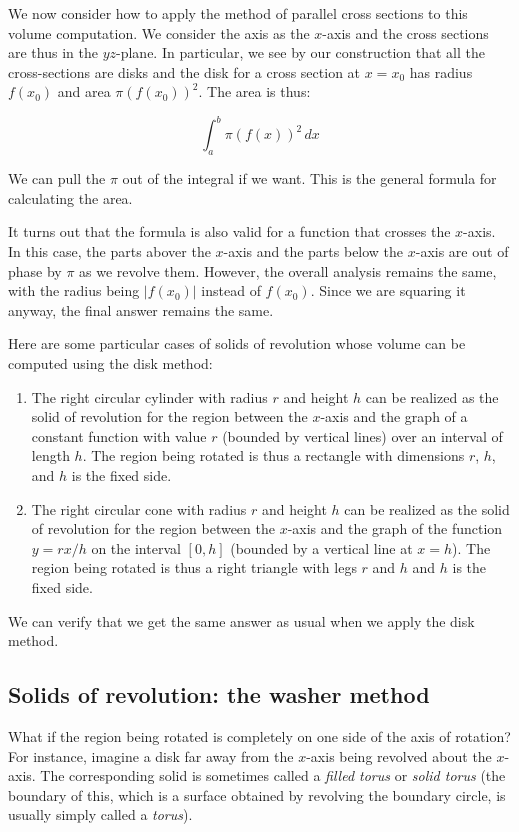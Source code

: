 \documentclass[10pt]{amsart}
\begin{document}
We now consider how to apply the method of parallel cross sections to
this volume computation. We consider the axis as the $x$-axis and the
cross sections are thus in the $yz$-plane. In particular, we see by
our construction that all the cross-sections are disks and the disk
for a cross section at $x = x_0$ has radius $f(x_0)$ and area $\pi
(f(x_0))^2$. The area is thus:

$$\int_a^b \pi (f(x))^2 \, dx$$

We can pull the $\pi$ out of the integral if we want. This is the
general formula for calculating the area.

It turns out that the formula is also valid for a function that
crosses the $x$-axis. In this case, the parts abover the $x$-axis and
the parts below the $x$-axis are out of phase by $\pi$ as we revolve
them. However, the overall analysis remains the same, with the radius
being $|f(x_0)|$ instead of $f(x_0)$. Since we are squaring it anyway,
the final answer remains the same.

Here are some particular cases of solids of revolution whose volume can be computed using the disk method:

\begin{enumerate}
\item The right circular cylinder with radius $r$ and height $h$ can
  be realized as the solid of revolution for the region between the
  $x$-axis and the graph of a constant function with value $r$
  (bounded by vertical lines) over an interval of length $h$. The
  region being rotated is thus a rectangle with dimensions $r$, $h$,
  and $h$ is the fixed side.
\item The right circular cone with radius $r$ and height $h$ can be
  realized as the solid of revolution for the region between the
  $x$-axis and the graph of the function $y = rx/h$ on the interval
  $[0,h]$ (bounded by a vertical line at $x = h$). The region being
  rotated is thus a right triangle with legs $r$ and $h$ and $h$ is
  the fixed side.
\end{enumerate}

We can verify that we get the same answer as usual when we apply the
disk method.

\subsection{Solids of revolution: the washer method}

What if the region being rotated is completely on one side of the axis
of rotation? For instance, imagine a disk far away from the $x$-axis
being revolved about the $x$-axis. The corresponding solid is
sometimes called a {\em filled torus} or {\em solid torus} (the
boundary of this, which is a surface obtained by revolving the
boundary circle, is usually simply called a {\em torus}).
\end{document}

